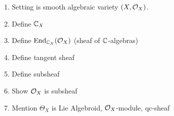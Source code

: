 \documentclass[a4paper]{article}
\begin{document}
\maketitle
\begin{enumerate}
    \item Setting is smooth algebraic variety $(X,\mathcal{O}_X)$.
    \item Define $\mathbb{C}_X$
    \item Define $\operatorname{End}_{\mathbb{C}_X}(\mathcal{O}_X)$ (sheaf of $\mathbb{C}$-algebras)
    \item Define tangent sheaf
    \item Define subsheaf
    \item Show $\mathcal{O}_X$ is subsheaf
    \item Mention $\Theta_X$ is Lie Algebroid, $\mathcal{O}_X$-module, qc-sheaf
\end{enumerate}
\end{document}
